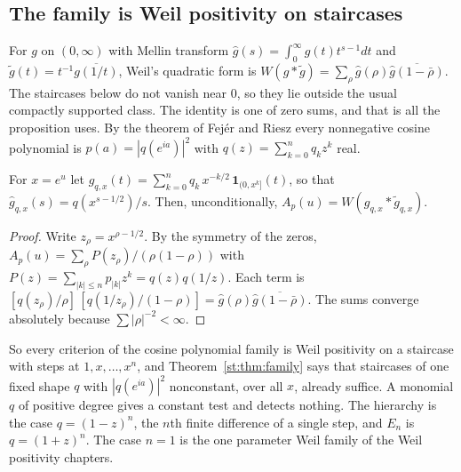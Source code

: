 \subsection{The family is Weil positivity on staircases}
For $g$ on $(0,\infty)$ with Mellin transform $\hat g(s)=\int_0^\infty g(t)t^{s-1}dt$ and $\tilde g(t)=t^{-1}\overline{g(1/t)}$, Weil's quadratic form \cite{Weil52} is $W(g*\tilde g)=\sum_\rho\hat g(\rho)\overline{\hat g(1-\bar\rho)}$. The staircases below do not vanish near $0$, so they lie outside the usual compactly supported class. The identity is one of zero sums, and that is all the proposition uses. By the theorem of Fej\'er and Riesz every nonnegative cosine polynomial is $p(a)=|q(e^{ia})|^2$ with $q(z)=\sum_{k=0}^nq_kz^k$ real.
\begin{proposition}\label{st:prop:weil}
For $x=e^u$ let $g_{q,x}(t)=\sum_{k=0}^n\allowbreak q_k\,x^{-k/2}\,\allowbreak\mathbf 1_{(0,x^k]}(t)$, so that $\hat g_{q,x}(s)=q(x^{s-1/2})/s$. Then, unconditionally, $A_p(u)=W(g_{q,x}\allowbreak*\tilde g_{q,x})$.
\end{proposition}
\begin{proof}
Write $z_\rho=x^{\rho-1/2}$. By the symmetry of the zeros, $A_p(u)=\sum_\rho P(z_\rho)/(\rho(1-\rho))$ with $P(z)=\sum_{|k|\le n}p_{|k|}z^k=q(z)q(1/z)$. Each term is $[q(z_\rho)/\rho]\,[q(1/z_\rho)/(1-\rho)]=\hat g(\rho)\overline{\hat g(1-\bar\rho)}$. The sums converge absolutely because $\sum|\rho|^{-2}<\infty$.
\end{proof}
So every criterion of the cosine polynomial family is Weil positivity on a staircase with steps at $1,x,\dots,x^n$, and Theorem~\ref{st:thm:family} says that staircases of one fixed shape $q$ with $|q(e^{ia})|^2$ nonconstant, over all $x$, already suffice. A monomial $q$ of positive degree gives a constant test and detects nothing. The hierarchy is the case $q=(1-z)^n$, the $n$th finite difference of a single step, and $E_n$ is $q=(1+z)^n$. The case $n=1$ is the one parameter Weil family of the Weil positivity chapters.

